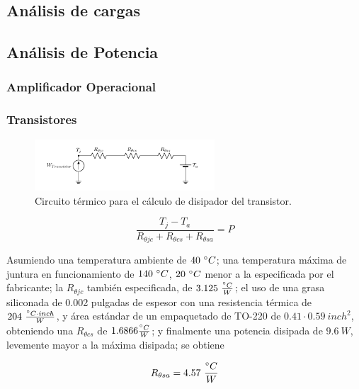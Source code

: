 \subsection{Análisis de cargas}

\subsection{Análisis de Potencia}

\subsubsection{Amplificador Operacional}

\subsubsection{Transistores}

\begin{figure}[H]
\centering
	\includegraphics[width=0.6\textwidth, page=1]{ImagenesEjercicio2/Potencia.pdf}
	\caption{Circuito térmico para el cálculo de disipador del transistor.}
	\label{fig:circuitopottrans}
\end{figure}

\begin{equation}
\frac{T_j - T_a}{R_{\theta jc}+R_{\theta cs}+R_{\theta sa}} = P
\end{equation}

Asumiendo una temperatura ambiente de $40 \ \degree C$; una temperatura máxima de juntura en funcionamiento de $140 \ \degree C$, $20 \ \degree C$ menor a la especificada por el fabricante; la $R_{\theta jc}$ también especificada, de $3.125 \ \frac{\degree C}{W}$; el uso de una grasa siliconada de 0.002 pulgadas de espesor con una resistencia térmica de $204 \ \frac{\degree C \cdot inch}{W}$, y área estándar de un empaquetado de TO-220 de $0.41\cdot 0.59 \ inch^2$, obteniendo una $R_{\theta cs}$ de $1.6866 \frac{\degree C}{W}$; y finalmente una potencia disipada de $9.6 \ W$, levemente mayor a la máxima disipada; se obtiene

\begin{equation}
R_{\theta sa} = 4.57  \  \frac{\degree C}{W}
\end{equation}
